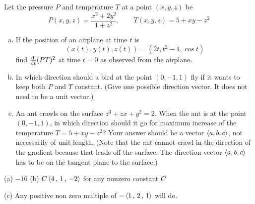 \begin{question}[M200 2014A] %
Let the pressure $P$ and temperature $T$ at a point $(x, y, z)$ be
\begin{equation*}
P(x,y,z) = \frac{x^2+2y^2}{1+z^2},\qquad
T(x,y,z) = 5 + xy - z^2
\end{equation*}
\begin{enumerate}[(a)]
\item
If the position of an airplane at time $t$ is
\begin{equation*}
(x(t), y(t), z(t)) = (2t, t^2 - 1, \cos t)
\end{equation*}
find $\diff{}{t} (PT)^2$ at time $t = 0$ as observed from the airplane.

\item
In which direction should a bird at the point $(0,-1,1)$ fly if it 
wants to keep both $P$ and $T$ constant. (Give one possible direction 
vector. It does not need to be a unit vector.)

\item
An ant crawls on the surface $z^3 + zx + y^2 = 2$. 
When the ant is at the point $(0,-1,1)$, in which direction should it 
go for maximum increase of the temperature $T = 5 + xy - z^2$?
Your answer should be a vector $\left< a, b, c\right>$, not necessarily 
of unit length. (Note that the ant cannot crawl in the direction of 
the gradient because that leads off the surface. The direction vector 
$\left< a, b, c\right>$ has to be on the tangent plane to the surface.)
\end{enumerate}
\end{question}

%

\begin{answer}
(a) $-16$\qquad
(b) $C \left<  4\,,\,  1 \,,\, -2\right>$ for any nonzero constant $C$

(c) Any positive non zero multiple of $-\left< 1\,,\, 2\,,\,1\right>$ will do.
\end{answer}

